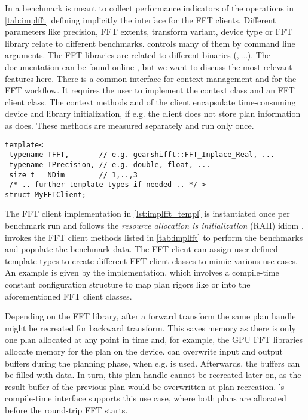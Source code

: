 In \gearshifft{} a benchmark is meant to collect performance indicators of the operations in \cref{tab:implfft} defining implicitly the interface for the FFT clients. Different parameters like precision, FFT extents, transform variant, device type or FFT library relate to different benchmarks. \gearshifft{} controls many of them by command line arguments. The FFT libraries are related to different \gearshifft{} binaries (, \ldots). The \gearshifft{} documentation can be found online \cite{gearshifft_github}, but we want to discuss the most relevant features here. 
There is a common interface for context management and for the FFT workflow. It requires the user to implement the context class and an FFT client class. The context methods  and  of the client encapsulate time-consuming device and library initialization, if e.g. the client does not store plan information as \fftw{} does. These methods are measured separately and run only once. 

\begin{lstlisting}[caption={Required template arguments for FFT client implementation},label={lst:implfft_templ}]
template<
 typename TFFT,       // e.g. gearshifft::FFT_Inplace_Real, ...
 typename TPrecision, // e.g. double, float, ...
 size_t   NDim        // 1,..,3
 /* .. further template types if needed .. */ >
struct MyFFTClient;
\end{lstlisting}


The FFT client implementation in \cref{lst:implfft_templ} is instantiated once per benchmark run and follows the {\textit{resource allocation is initialization}} (RAII) idiom \cite{stroustrup1994design}. \gearshifft{} invokes the FFT client methods listed in \cref{tab:implfft} to perform the benchmarks and populate the benchmark data. The FFT client can assign user-defined template types to create different FFT client classes to mimic various use cases. An example is given by the \fftw{} implementation, which involves a compile-time constant configuration structure to map plan rigors like  or  into the aforementioned FFT client classes.

Depending on the FFT library, after a forward transform the same plan handle might be recreated for backward transform. This saves memory as there is only one plan allocated at any point in time and, for example, the GPU FFT libraries allocate memory for the plan on the device. \fftw{} can overwrite input and output buffers during the planning phase, when e.g.  is used. Afterwards, the buffers can be filled with data. In turn, this plan handle cannot be recreated later on, as the result buffer of the previous plan would be overwritten at plan recreation. \gearshifft{}'s compile-time interface supports this use case, where both plans are allocated before the round-trip FFT starts.

